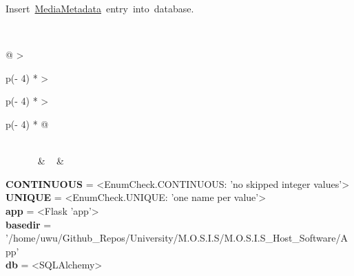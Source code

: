 \begin{longtable}[]
\begin{minipage}[t]{\linewidth}
\begin{description}
\tightlist
\item[\protect\hypertarget{-insertMediaMetadata}{}{\textbf{insertMediaMetadata}}(db,
entryId, leftCameraMedia, rightCameraMedia, temperature, pressure, ph,
dissolvedOxygen)]
{Insert~\protect\hyperlink{MediaMetadata}{MediaMetadata}~entry~into~database.}
\end{description}
\end{minipage} \\
\bottomrule
\end{longtable}

\begin{longtable}[]{@{}
  >{\raggedright\arraybackslash}p{(\columnwidth - 4\tabcolsep) * }
  >{\raggedright\arraybackslash}p{(\columnwidth - 4\tabcolsep) * }
  >{\raggedright\arraybackslash}p{(\columnwidth - 4\tabcolsep) * }@{}}
\toprule
\endhead
{} \\
{~~~~~~} & ~ & \begin{minipage}[t]{\linewidth}\raggedright
\textbf{CONTINUOUS} = \textless EnumCheck.CONTINUOUS: 'no skipped
integer values'\textgreater{}\\
\textbf{UNIQUE} = \textless EnumCheck.UNIQUE: 'one name per
value'\textgreater{}\\
\textbf{app} = \textless Flask 'app'\textgreater{}\\
\textbf{basedir} =
'/home/uwu/Github\_Repos/University/M.O.S.I.S/M.O.S.I.S\_Host\_Software/App'\\
\textbf{db} = \textless SQLAlchemy\textgreater{}\strut
\end{minipage} \\
\bottomrule
\end{longtable}
